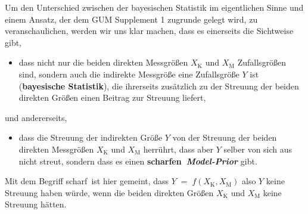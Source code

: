 Um den Unterschied zwischen der bayesischen Statistik im eigentlichen Sinne
und einem Ansatz, der dem GUM Supplement 1 \cite{GUMS1} zugrunde gelegt wird, zu veranschaulichen,
werden wir uns klar machen, dass es einerseits die Sichtweise gibt,
\begin{itemize}
\item dass nicht nur die beiden direkten Messgrößen $X_\mathrm{K}$ und $X_\mathrm{M}$
Zufallsgrößen sind, sondern auch die indirekte Messgröße eine Zufallsgröße $Y$ ist
(\textbf{bayesische Statistik}),
die ihrerseits zusätzlich zu der Streuung der beiden direkten Größen einen Beitrag zur
Streuung liefert,
\end{itemize}
und andererseits,
\begin{itemize}
\item dass die Streuung der indirekten Größe $Y$ von der Streuung der beiden
direkten Messgrößen $X_\mathrm{K}$ und $X_\mathrm{M}$ herrührt, dass aber $Y$ selber von sich
aus nicht streut, sondern dass es
einen \textbf{\glqq scharfen\grqq ~\textsl{Model-Prior}} gibt.
\end{itemize}
Mit dem Begriff \glqq scharf\grqq ~ist hier gemeint, dass $Y \; = \; f(X_\mathrm{K}, X_\mathrm{M})$
also $Y$ keine Streuung haben würde, wenn die beiden direkten Größen
$X_\mathrm{K}$ und $X_\mathrm{M}$ keine Streuung hätten.

